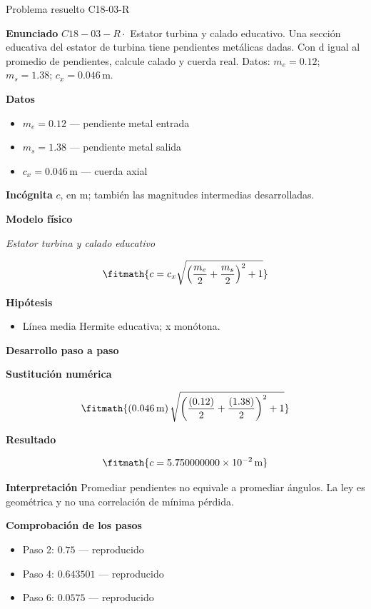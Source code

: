 \documentclass[10pt,openany]{book}
\begin{document}
\begin{studiumworked}{Problema resuelto C18-03-R}


\noindent\textbf{Enunciado}
\(C18-03-R \cdot\) Estator turbina y calado educativo. Una sección educativa del estator de turbina tiene pendientes metálicas dadas. Con d igual al promedio de pendientes, calcule calado y cuerda real. Datos: \(m_e=0.12\); \(m_s=1.38\); \(c_x=0.046\, \mathrm{m}\).

\noindent\textbf{Datos}
\begin{itemize}
\item $m_e = 0.12$ — pendiente metal entrada
\item $m_s = 1.38$ — pendiente metal salida
\item $c_x = 0.046\,\mathrm{m}$ — cuerda axial
\end{itemize}

\noindent\textbf{Incógnita}
$c$, en $\mathrm{m}$; también las magnitudes intermedias desarrolladas.

\noindent\textbf{Modelo físico}

\noindent\textit{Estator turbina y calado educativo}

\[
\fitmath{c=c_x \sqrt{\left(\frac{m_e}{2} + \frac{m_s}{2}\right)^{2} + 1}}
\]

\noindent\textbf{Hipótesis}
\begin{itemize}
\item Línea media Hermite educativa; x monótona.
\end{itemize}

\noindent\textbf{Desarrollo paso a paso}



\noindent\textbf{Sustitución numérica}

\[
\fitmath{\left(0.046\,\mathrm{m}\right) \sqrt{\left(\frac{\left(0.12\right)}{2} + \frac{\left(1.38\right)}{2}\right)^{2} + 1}}
\]

\noindent\textbf{Resultado}

\[
\fitmath{c=5.750000000\times10^{-2}\,\mathrm{m}}
\]

\noindent\textbf{Interpretación}
Promediar pendientes no equivale a promediar ángulos. La ley es geométrica y no una correlación de mínima pérdida.

\noindent\textbf{Comprobación de los pasos}
\begin{itemize}
\item Paso 2: $0.75$ — reproducido
\item Paso 4: $0.643501$ — reproducido
\item Paso 6: $0.0575$ — reproducido
\end{itemize}


\end{studiumworked}
\end{document}
